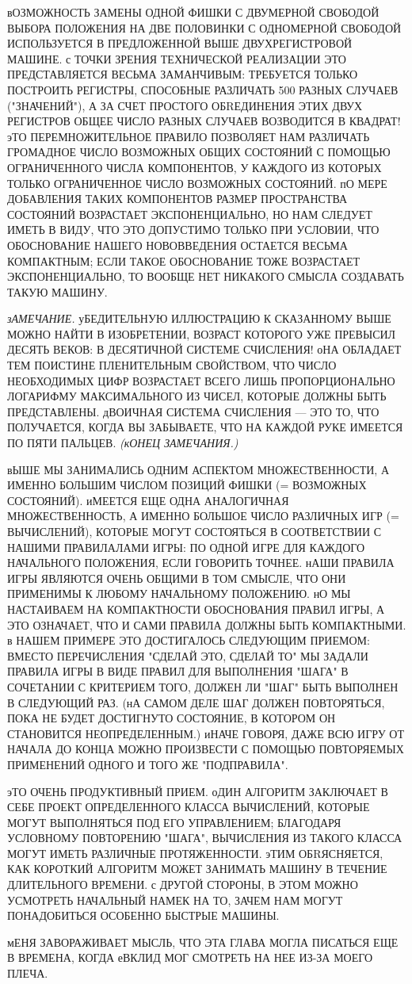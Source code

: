 вОЗМОЖНОСТЬ ЗАМЕНЫ ОДНОЙ ФИШКИ С ДВУМЕРНОЙ СВОБОДОЙ ВЫБОРА ПОЛОЖЕНИЯ НА ДВЕ 
ПОЛОВИНКИ С ОДНОМЕРНОЙ СВОБОДОЙ ИСПОЛЬЗУЕТСЯ В ПРЕДЛОЖЕННОЙ ВЫШЕ 
ДВУХРЕГИСТРОВОЙ МАШИНЕ. с ТОЧКИ ЗРЕНИЯ ТЕХНИЧЕСКОЙ РЕАЛИЗАЦИИ ЭТО
ПРЕДСТАВЛЯЕТСЯ ВЕСЬМА ЗАМАНЧИВЫМ: ТРЕБУЕТСЯ ТОЛЬКО ПОСТРОИТЬ РЕГИСТРЫ, 
СПОСОБНЫЕ РАЗЛИЧАТЬ 500 РАЗНЫХ СЛУЧАЕВ ("ЗНАЧЕНИЙ"), А ЗА СЧЕТ ПРОСТОГО
ОБRЕДИНЕНИЯ ЭТИХ ДВУХ РЕГИСТРОВ ОБЩЕЕ ЧИСЛО РАЗНЫХ СЛУЧАЕВ ВОЗВОДИТСЯ В 
КВАДРАТ! эТО ПЕРЕМНОЖИТЕЛЬНОЕ ПРАВИЛО ПОЗВОЛЯЕТ НАМ РАЗЛИЧАТЬ ГРОМАДНОЕ ЧИСЛО
ВОЗМОЖНЫХ ОБЩИХ СОСТОЯНИЙ С ПОМОЩЬЮ ОГРАНИЧЕННОГО ЧИСЛА КОМПОНЕНТОВ, У КАЖДОГО 
ИЗ КОТОРЫХ ТОЛЬКО ОГРАНИЧЕННОЕ ЧИСЛО ВОЗМОЖНЫХ СОСТОЯНИЙ. пО МЕРЕ
ДОБАВЛЕНИЯ ТАКИХ КОМПОНЕНТОВ РАЗМЕР ПРОСТРАНСТВА СОСТОЯНИЙ ВОЗРАСТАЕТ 
ЭКСПОНЕНЦИАЛЬНО, НО НАМ СЛЕДУЕТ ИМЕТЬ В ВИДУ, ЧТО ЭТО ДОПУСТИМО ТОЛЬКО ПРИ
УСЛОВИИ, ЧТО ОБОСНОВАНИЕ НАШЕГО НОВОВВЕДЕНИЯ ОСТАЕТСЯ ВЕСЬМА КОМПАКТНЫМ; 
ЕСЛИ ТАКОЕ ОБОСНОВАНИЕ ТОЖЕ ВОЗРАСТАЕТ ЭКСПОНЕНЦИАЛЬНО, ТО ВООБЩЕ НЕТ
НИКАКОГО СМЫСЛА СОЗДАВАТЬ ТАКУЮ МАШИНУ.

{\sl зАМЕЧАНИЕ.} уБЕДИТЕЛЬНУЮ ИЛЛЮСТРАЦИЮ К СКАЗАННОМУ ВЫШЕ МОЖНО НАЙТИ 
В ИЗОБРЕТЕНИИ, ВОЗРАСТ КОТОРОГО УЖЕ ПРЕВЫСИЛ ДЕСЯТЬ ВЕКОВ: В ДЕСЯТИЧНОЙ
СИСТЕМЕ СЧИСЛЕНИЯ! оНА ОБЛАДАЕТ ТЕМ ПОИСТИНЕ ПЛЕНИТЕЛЬНЫМ СВОЙСТВОМ, ЧТО 
ЧИСЛО НЕОБХОДИМЫХ ЦИФР ВОЗРАСТАЕТ ВСЕГО ЛИШЬ ПРОПОРЦИОНАЛЬНО ЛОГАРИФМУ
МАКСИМАЛЬНОГО ИЗ ЧИСЕЛ, КОТОРЫЕ ДОЛЖНЫ БЫТЬ ПРЕДСТАВЛЕНЫ. дВОИЧНАЯ СИСТЕМА 
СЧИСЛЕНИЯ --- ЭТО ТО, ЧТО ПОЛУЧАЕТСЯ, КОГДА ВЫ ЗАБЫВАЕТЕ, ЧТО НА КАЖДОЙ РУКЕ 
ИМЕЕТСЯ ПО ПЯТИ ПАЛЬЦЕВ. {\sl(кОНЕЦ ЗАМЕЧАНИЯ.)}

вЫШЕ МЫ ЗАНИМАЛИСЬ ОДНИМ АСПЕКТОМ МНОЖЕСТВЕННОСТИ, А ИМЕННО БОЛЬШИМ ЧИСЛОМ 
ПОЗИЦИЙ ФИШКИ (= ВОЗМОЖНЫХ СОСТОЯНИЙ). иМЕЕТСЯ ЕЩЕ ОДНА АНАЛОГИЧНАЯ
МНОЖЕСТВЕННОСТЬ, А ИМЕННО БОЛЬШОЕ ЧИСЛО РАЗЛИЧНЫХ ИГР (= ВЫЧИСЛЕНИЙ), 
КОТОРЫЕ МОГУТ СОСТОЯТЬСЯ В СООТВЕТСТВИИ С НАШИМИ ПРАВИЛАЛАМИ ИГРЫ: ПО ОДНОЙ
ИГРЕ ДЛЯ КАЖДОГО НАЧАЛЬНОГО ПОЛОЖЕНИЯ, ЕСЛИ ГОВОРИТЬ ТОЧНЕЕ. нАШИ ПРАВИЛА ИГРЫ 
ЯВЛЯЮТСЯ ОЧЕНЬ ОБЩИМИ В ТОМ СМЫСЛЕ, ЧТО ОНИ ПРИМЕНИМЫ К ЛЮБОМУ НАЧАЛЬНОМУ 
ПОЛОЖЕНИЮ. нО МЫ НАСТАИВАЕМ НА КОМПАКТНОСТИ ОБОСНОВАНИЯ ПРАВИЛ ИГРЫ, А ЭТО
ОЗНАЧАЕТ, ЧТО И САМИ ПРАВИЛА ДОЛЖНЫ БЫТЬ КОМПАКТНЫМИ. в НАШЕМ ПРИМЕРЕ ЭТО 
ДОСТИГАЛОСЬ СЛЕДУЮЩИМ ПРИЕМОМ: ВМЕСТО ПЕРЕЧИСЛЕНИЯ "СДЕЛАЙ ЭТО, СДЕЛАЙ ТО" 
МЫ ЗАДАЛИ ПРАВИЛА ИГРЫ В ВИДЕ ПРАВИЛ ДЛЯ ВЫПОЛНЕНИЯ "ШАГА" В  СОЧЕТАНИИ С
КРИТЕРИЕМ ТОГО, ДОЛЖЕН ЛИ "ШАГ" БЫТЬ ВЫПОЛНЕН В СЛЕДУЮЩИЙ РАЗ. 
(нА САМОМ ДЕЛЕ ШАГ ДОЛЖЕН ПОВТОРЯТЬСЯ, ПОКА НЕ БУДЕТ ДОСТИГНУТО СОСТОЯНИЕ, В
КОТОРОМ ОН СТАНОВИТСЯ НЕОПРЕДЕЛЕННЫМ.) иНАЧЕ ГОВОРЯ, ДАЖЕ ВСЮ ИГРУ ОТ НАЧАЛА 
ДО КОНЦА МОЖНО ПРОИЗВЕСТИ С ПОМОЩЬЮ ПОВТОРЯЕМЫХ ПРИМЕНЕНИЙ ОДНОГО
И ТОГО ЖЕ "ПОДПРАВИЛА".

эТО ОЧЕНЬ ПРОДУКТИВНЫЙ ПРИЕМ. оДИН АЛГОРИТМ ЗАКЛЮЧАЕТ В СЕБЕ ПРОЕКТ 
ОПРЕДЕЛЕННОГО КЛАССА ВЫЧИСЛЕНИЙ, КОТОРЫЕ МОГУТ ВЫПОЛНЯТЬСЯ ПОД ЕГО 
УПРАВЛЕНИЕМ; БЛАГОДАРЯ УСЛОВНОМУ ПОВТОРЕНИЮ "ШАГА", ВЫЧИСЛЕНИЯ
ИЗ ТАКОГО КЛАССА МОГУТ ИМЕТЬ РАЗЛИЧНЫЕ ПРОТЯЖЕННОСТИ. эТИМ ОБRЯСНЯЕТСЯ, 
КАК КОРОТКИЙ АЛГОРИТМ МОЖЕТ ЗАНИМАТЬ МАШИНУ В ТЕЧЕНИЕ ДЛИТЕЛЬНОГО ВРЕМЕНИ. 
с ДРУГОЙ СТОРОНЫ, В ЭТОМ МОЖНО УСМОТРЕТЬ НАЧАЛЬНЫЙ НАМЕК НА ТО, ЗАЧЕМ НАМ
МОГУТ ПОНАДОБИТЬСЯ ОСОБЕННО БЫСТРЫЕ МАШИНЫ.

мЕНЯ ЗАВОРАЖИВАЕТ МЫСЛЬ, ЧТО ЭТА ГЛАВА МОГЛА ПИСАТЬСЯ ЕЩЕ В ВРЕМЕНА, 
КОГДА еВКЛИД МОГ СМОТРЕТЬ НА НЕЕ ИЗ-ЗА МОЕГО ПЛЕЧА.
\bye

